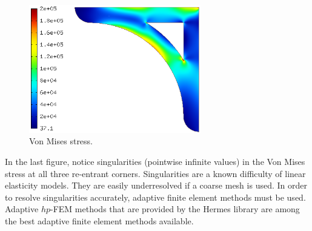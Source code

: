 \documentclass{article}
\begin{document}
\begin{figure}[!ht]
\begin{center}
\includegraphics[width=7.5cm]{img/result-3.png}
\caption{Von Mises stress.}
\vspace{4mm}
\end{center}
\end{figure}
\noindent
In the last figure, notice singularities (pointwise infinite values) in the Von Mises 
stress at all three re-entrant corners. Singularities are a known difficulty of linear
elasticity models. They are easily underresolved if a coarse mesh is used. In order to 
resolve singularities accurately, adaptive finite element methods must be used. 
Adaptive $hp$-FEM methods that are provided by the Hermes library are among the 
best adaptive finite element methods available.
\end{document}
